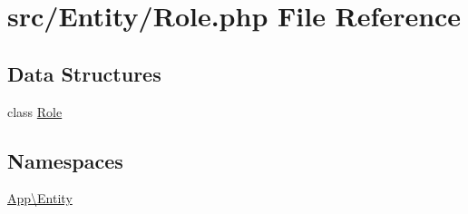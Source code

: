 \hypertarget{_role_8php}{}\section{src/\+Entity/\+Role.php File Reference}
\label{_role_8php}
\subsection*{Data Structures}
\begin{DoxyCompactItemize}
\item 
class \mbox{\hyperlink{class_app_1_1_entity_1_1_role}{Role}}
\end{DoxyCompactItemize}
\subsection*{Namespaces}
\begin{DoxyCompactItemize}
\item 
 \mbox{\hyperlink{namespace_app_1_1_entity}{App\textbackslash{}\+Entity}}
\end{DoxyCompactItemize}
